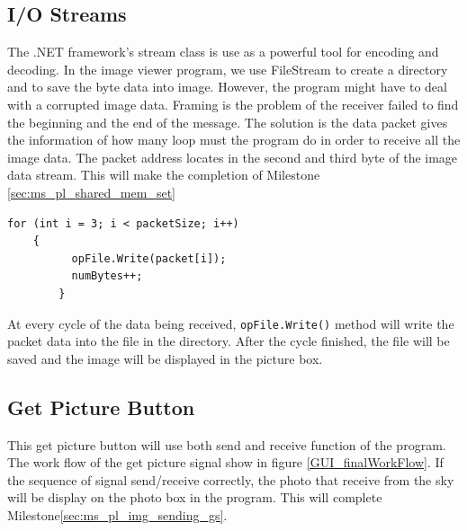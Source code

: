 \subsection{I/O Streams}
    The .NET framework's stream class is use as a powerful tool for encoding and decoding\cite{davidB}. In the image viewer program, we use FileStream to create a directory and to save the byte data into image. However, the program might have to deal with a corrupted image data. Framing is the problem of the receiver failed to find the beginning and the end of the message. The solution is the data packet gives the information of how many loop must the program do in order to receive all the image data. The packet address locates in the second and third byte of the image data stream. This will make the completion of Milestone \ref{sec:ms_pl_shared_mem_set}
    
\begin{lstlisting}[caption={writing binary file},label=lst:writingb]          
	for (int i = 3; i < packetSize; i++)
	{
          opFile.Write(packet[i]);
          numBytes++;
    	}
\end{lstlisting}         

At every cycle of the data being received, \texttt{opFile.Write()} method will write the packet data into the file in the directory. After the cycle finished, the file will be saved and the image will be displayed in the picture box. 

\subsection{Get Picture Button}
This get picture button will use both send and receive function of the program. 
The work flow of the get picture signal show in figure \ref{GUI_finalWorkFlow}.
If the sequence of signal send/receive correctly, the photo that receive from the sky will be display on the photo box in the program.
This will complete Milestone\ref{sec:ms_pl_img_sending_gs}.

